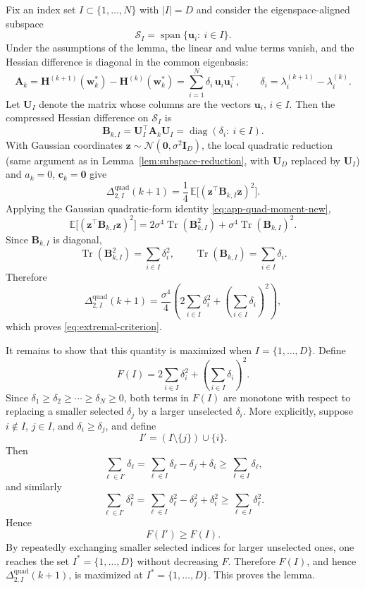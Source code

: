\documentclass{article}
\begin{document}
Fix an index set $I\subset\{1,\dots,N\}$ with $|I|=D$ and consider the eigenspace-aligned subspace
\[
\mathcal S_I=\operatorname{span}\{\mathbf u_i:\ i\in I\}.
\]
Under the assumptions of the lemma, the linear and value terms vanish, and the Hessian difference is diagonal in the common eigenbasis:
\[
\mathbf A_k
=
\mathbf H^{(k+1)}(\mathbf w_k^*)-\mathbf H^{(k)}(\mathbf w_k^*)
=
\sum_{i=1}^N \delta_i\, \mathbf u_i\mathbf u_i^\top,
\qquad
\delta_i=\lambda_i^{(k+1)}-\lambda_i^{(k)}.
\]
Let $\mathbf U_I$ denote the matrix whose columns are the vectors $\mathbf u_i$, $i\in I$.
Then the compressed Hessian difference on $\mathcal S_I$ is
\[
\mathbf B_{k,I}
=
\mathbf U_I^\top \mathbf A_k \mathbf U_I
=
\operatorname{diag}(\delta_i:\ i\in I).
\]
With Gaussian coordinates $\mathbf z\sim\mathcal N(\mathbf 0,\sigma^2\mathbf I_D)$, the local quadratic reduction (same argument as in Lemma~\ref{lem:subspace-reduction}, with $\mathbf U_D$ replaced by $\mathbf U_I$) and $a_k=0$, $\mathbf c_k=\mathbf 0$ give
\[
\Delta_{2,I}^{\mathrm{quad}}(k+1)
=
\frac14\,\mathbb E\bigl[(\mathbf z^\top \mathbf B_{k,I}\mathbf z)^2\bigr].
\]
Applying the Gaussian quadratic-form identity \eqref{eq:app-quad-moment-new},
\[
\mathbb E\bigl[(\mathbf z^\top \mathbf B_{k,I}\mathbf z)^2\bigr]
=
2\sigma^4 \operatorname{Tr}(\mathbf B_{k,I}^2)
+
\sigma^4 \operatorname{Tr}(\mathbf B_{k,I})^2.
\]
Since $\mathbf B_{k,I}$ is diagonal,
\[
\operatorname{Tr}(\mathbf B_{k,I}^2)=\sum_{i\in I}\delta_i^2,
\qquad
\operatorname{Tr}(\mathbf B_{k,I})=\sum_{i\in I}\delta_i.
\]
Therefore
\[
\Delta_{2,I}^{\mathrm{quad}}(k+1)
=
\frac{\sigma^4}{4}
\left(
2\sum_{i\in I}\delta_i^2
+
\left(\sum_{i\in I}\delta_i\right)^2
\right),
\]
which proves \eqref{eq:extremal-criterion}.

It remains to show that this quantity is maximized when $I=\{1,\dots,D\}$.
Define
\[
F(I)
=
2\sum_{i\in I}\delta_i^2
+
\left(\sum_{i\in I}\delta_i\right)^2.
\]
Since $\delta_1\ge\delta_2\ge\cdots\ge\delta_N\ge0$, both terms in $F(I)$ are monotone with respect to replacing a smaller selected $\delta_j$ by a larger unselected $\delta_i$. More explicitly, suppose $i\notin I$, $j\in I$, and $\delta_i\ge \delta_j$, and define
\[
I'=(I\setminus\{j\})\cup\{i\}.
\]
Then
\[
\sum_{\ell\in I'}\delta_\ell
=
\sum_{\ell\in I}\delta_\ell - \delta_j + \delta_i
\ge
\sum_{\ell\in I}\delta_\ell,
\]
and similarly
\[
\sum_{\ell\in I'}\delta_\ell^2
=
\sum_{\ell\in I}\delta_\ell^2 - \delta_j^2 + \delta_i^2
\ge
\sum_{\ell\in I}\delta_\ell^2.
\]
Hence
\[
F(I')\ge F(I).
\]
By repeatedly exchanging smaller selected indices for larger unselected ones, one reaches the set $I^*=\{1,\dots,D\}$ without decreasing $F$. Therefore $F(I)$, and hence $\Delta_{2,I}^{\mathrm{quad}}(k+1)$, is maximized at $I^*=\{1,\dots,D\}$. This proves the lemma.
\end{document}
